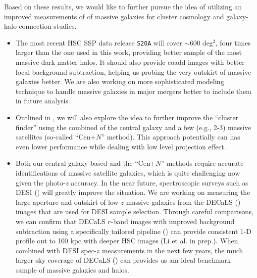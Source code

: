 \documentclass[a4paper,fleqn,usenatbib]{mnras}
\begin{document}
    Based on these results, we would like to further pursue the idea of utilizing an improved 
    measurements of \mstar{} of massive galaxies for cluster cosmology and galaxy-halo connection 
    studies.
    
    
    \begin{itemize}
    
        \item The most recent HSC SSP data release \texttt{S20A} will cover $\sim 600$ deg$^2$, 
            four times larger than the one used in this work, providing better sample of the 
            most massive dark matter halos.
            It should also provide coadd images with better local background subtraction, helping
            us probing the very outskirt of massive galaxies better.
            We are also working on more sophisticated modeling technique to handle massive 
            galaxies in major mergers better to include them in future analysis.
        
        \item Outlined in \citet{Bradshaw2020}, we will also explore the idea to further improve 
            the ``cluster finder'' using the combined \mstar{} of the central galaxy and a few 
            (e.g., 2-3) massive satellites (so-called ``Cen$+N$'' method).
            This approach potentially can has even lower \sigmh{} performance while dealing with 
            low level projection effect.
        
        \item Both our central galaxy-based and the ``Cen$+N$'' methods require accurate identifications
            of massive satellite galaxies, which is quite challenging now given the photo-$z$
            accuracy. 
            In the near future, spectroscopic surveys such as DESI (\addref{}) will greatly improve 
            the situation.
            We are working on measuring the large aperture and outskirt \mstar{} of low-$z$ massive 
            galaxies from the DECaLS (\addref{}) images that are used for DESI sample selection.
            Through careful comparisons, we can confirm that DECaLS $r$-band images with improved
            background subtraction using a specifically tailored pipeline (\addref{}) can provide 
            consistent 1-D profile out to 100 kpc with deeper HSC images (Li et al. in prep.).
            When combined with DESI spec-$z$ measurements in the next few years, the much larger 
            sky coverage of DECaLS () can provides us am ideal benchmark sample
            of massive galaxies and halos.
        
    \end{itemize}
\end{document}
